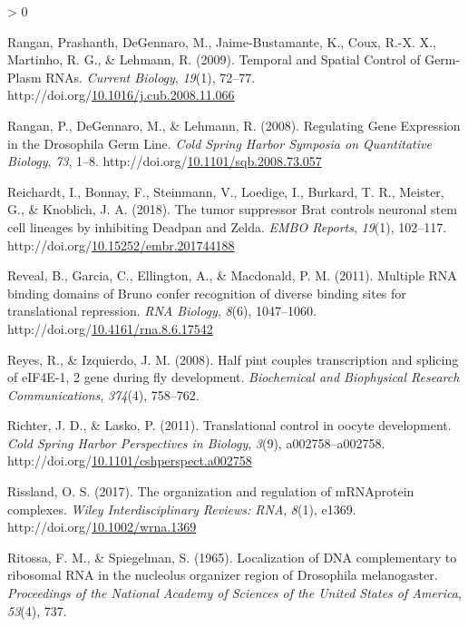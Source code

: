 \documentclass[12pt,oneside]{reedthesis}
\newlength{\cslhangindent}
\newenvironment{CSLReferences}[2] %
 {%
  \setlength{\parindent}{0pt}
  \ifodd #1 \everypar{\setlength{\hangindent}{\cslhangindent}}\ignorespaces\fi
  \ifnum #2 > 0
  \setlength{\parskip}{#2\baselineskip}
  \fi
 }%
 {}
\begin{document}
\begin{CSLReferences}{1}{0}
\leavevmode\hypertarget{ref-Rangan2009}{}%
Rangan, Prashanth, DeGennaro, M., Jaime-Bustamante, K., Coux, R.-X. X., Martinho, R. G., \& Lehmann, R. (2009). Temporal and {Spatial Control} of {Germ-Plasm RNAs}. \emph{Current Biology}, \emph{19}(1), 72--77. http://doi.org/\href{https://doi.org/10.1016/j.cub.2008.11.066}{10.1016/j.cub.2008.11.066}

\leavevmode\hypertarget{ref-Rangan2008}{}%
Rangan, P., DeGennaro, M., \& Lehmann, R. (2008). Regulating {Gene Expression} in the {Drosophila Germ Line}. \emph{Cold Spring Harbor Symposia on Quantitative Biology}, \emph{73}, 1--8. http://doi.org/\href{https://doi.org/10.1101/sqb.2008.73.057}{10.1101/sqb.2008.73.057}

\leavevmode\hypertarget{ref-Reichardt2018d}{}%
Reichardt, I., Bonnay, F., Steinmann, V., Loedige, I., Burkard, T. R., Meister, G., \& Knoblich, J. A. (2018). The tumor suppressor {Brat} controls neuronal stem cell lineages by inhibiting {Deadpan} and {Zelda}. \emph{EMBO Reports}, \emph{19}(1), 102--117. http://doi.org/\href{https://doi.org/10.15252/embr.201744188}{10.15252/embr.201744188}

\leavevmode\hypertarget{ref-Reveal2011j}{}%
Reveal, B., Garcia, C., Ellington, A., \& Macdonald, P. M. (2011). Multiple {RNA} binding domains of {Bruno} confer recognition of diverse binding sites for translational repression. \emph{RNA Biology}, \emph{8}(6), 1047--1060. http://doi.org/\href{https://doi.org/10.4161/rna.8.6.17542}{10.4161/rna.8.6.17542}

\leavevmode\hypertarget{ref-Reyes2008}{}%
Reyes, R., \& Izquierdo, J. M. (2008). Half pint couples transcription and splicing of {eIF4E-1}, 2 gene during fly development. \emph{Biochemical and Biophysical Research Communications}, \emph{374}(4), 758--762.

\leavevmode\hypertarget{ref-Richter2011j}{}%
Richter, J. D., \& Lasko, P. (2011). Translational control in oocyte development. \emph{Cold Spring Harbor Perspectives in Biology}, \emph{3}(9), a002758--a002758. http://doi.org/\href{https://doi.org/10.1101/cshperspect.a002758}{10.1101/cshperspect.a002758}

\leavevmode\hypertarget{ref-Rissland2017k}{}%
Rissland, O. S. (2017). The organization and regulation of {mRNA}{}protein complexes. \emph{Wiley Interdisciplinary Reviews: RNA}, \emph{8}(1), e1369. http://doi.org/\href{https://doi.org/10.1002/wrna.1369}{10.1002/wrna.1369}

\leavevmode\hypertarget{ref-Ritossa1965a}{}%
Ritossa, F. M., \& Spiegelman, S. (1965). Localization of {DNA} complementary to ribosomal {RNA} in the nucleolus organizer region of {Drosophila} melanogaster. \emph{Proceedings of the National Academy of Sciences of the United States of America}, \emph{53}(4), 737.


\end{CSLReferences}
\end{document}
